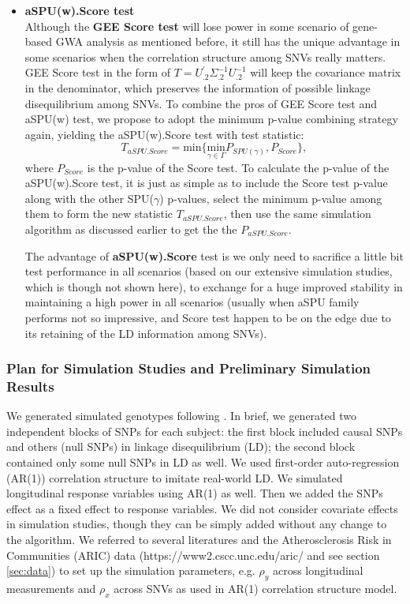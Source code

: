 \documentclass[12pt]{article}
\begin{document}
\begin{itemize}
\item \textbf{aSPU(w).Score test }\\
Although the \textbf{GEE Score test} will lose power in some scenario of gene-based GWA analysis as mentioned before, it still has the unique advantage in some scenarios when the correlation structure among SNVs really matters. GEE Score test in the form of $T=U_{.2}^{'}\Sigma_{.2}^{-1}U_{.2}^{-1}$ will keep the covariance matrix in the denominator, which preserves the information of possible linkage disequilibrium among SNVs. To combine the pros of GEE Score test and aSPU(w) test, we propose to adopt the minimum p-value combining strategy again, yielding the aSPU(w).Score test with test statistic:
$$
T_{aSPU.Score} = \textrm{min} \Big\{ \underset{\gamma\in\Gamma}{ \textrm{min} } P_{ SPU(\gamma) }, P_{Score} \Big\},
$$ 
where $P_{Score}$ is the p-value of the Score test. To calculate the p-value of the aSPU(w).Score test, it is just as simple as to include the Score test p-value along with the other SPU($\gamma$) p-values, select the minimum p-value among them to form the new statistic $T_{aSPU.Score}$, then use the same simulation algorithm as discussed earlier to get the the $P_{aSPU.Score}$.

The advantage of \textbf{aSPU(w).Score} test is we only need to sacrifice a little bit test performance in all scenarios (based on our extensive simulation studies, which is though not shown here), to exchange for a huge improved stability in maintaining a high power in all scenarios (usually when aSPU family performs not so impressive, and Score test happen to be on the edge due to its retaining of the LD information among SNVs).
\end{itemize}


\subsubsection{Plan for Simulation Studies and Preliminary Simulation Results}\label{sec:subsub1-2}
We generated simulated genotypes following \cite{Basu2011}. In brief,
we generated two independent blocks of SNPs for each subject: the
first block included causal SNPs and others (null SNPs) in linkage
disequilibrium (LD); the second block contained only some null SNPs in LD as well. We used first-order auto-regression (AR(1)) correlation structure to imitate real-world LD. We simulated longitudinal response variables using AR(1) as well. Then we added the SNPs effect as a fixed effect to response variables. We did not consider covariate effects in simulation studies, though they can be simply added without any change to the algorithm. We referred to several literatures \cite{pan2014powerful,Basu2011,Pan2011,Han2010,Pan2009} and the Atherosclerosis Risk in Communities (ARIC) data (https://www2.cscc.unc.edu/aric/ and see section \ref{sec:data}) to set up the simulation parameters, e.g. $\rho_y$ across longitudinal measurements and $\rho_x$ across SNVs as used in AR(1) correlation structure model.
\end{document}
